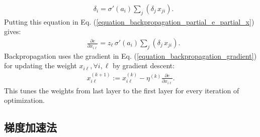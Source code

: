 \documentclass[lang=cn,10pt]{gorgeousnbook}
\numberwithin{equation}{section}%
\numberwithin{figure}{section}%
\begin{document}
\begin{align*}
& \delta_i = \sigma'(a_i) \sum_j (\delta_j\, x_{ji}). 
\end{align*}
Putting this equation in Eq. (\ref{equation_backpropagation_partial_e_partial_x}) gives:
\begin{align}\label{equation_backpropagation_gradient}
& \frac{\partial e}{\partial x_{i\ell}} = z_\ell\, \sigma'(a_i) \sum_j (\delta_j\, x_{ji}).
\end{align}
Backpropagation uses the gradient in Eq. (\ref{equation_backpropagation_gradient}) for updating the weight $x_{i\ell}, \forall i, \ell$ by gradient descent:
\begin{align*}
x_{i\ell}^{(k+1)} := x_{i\ell}^{(k)} - \eta^{(k)} \frac{\partial e}{\partial x_{i\ell}}. 
\end{align*}
This tunes the weights from last layer to the first layer for every iteration of optimization. 

\subsection{梯度加速法}

\end{document}
